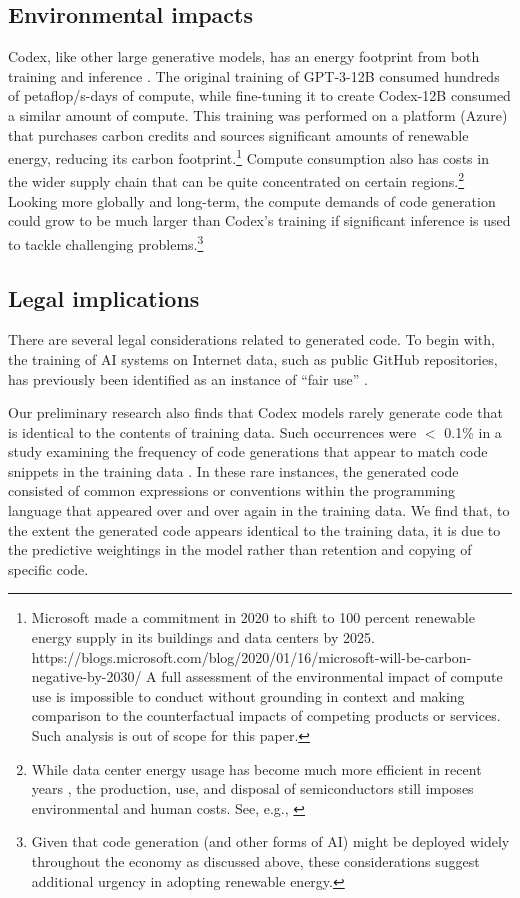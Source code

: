 \subsection{Environmental impacts}
\label{sec:impacts:environment}
Codex, like other large generative models, has an energy footprint from both training and inference \citep{schwartz2019green, bender2021dangers, patterson2021carbon}. The original training of GPT-3-12B consumed hundreds of petaflop/s-days of compute, while fine-tuning it to create Codex-12B consumed a similar amount of compute. This training was performed on a platform (Azure) that purchases carbon credits and sources significant amounts of renewable energy, reducing its carbon footprint.\footnote{Microsoft made a commitment in 2020 to shift to 100 percent renewable energy supply in its buildings and data centers by 2025. https://blogs.microsoft.com/blog/2020/01/16/microsoft-will-be-carbon-negative-by-2030/  A full assessment of the environmental impact of compute use is impossible to conduct without grounding in context and making comparison to the counterfactual impacts of competing products or services. Such analysis is out of scope for this paper.} Compute consumption also has costs in the wider supply chain that can be quite concentrated on certain regions.\footnote{While data center energy usage has become much more efficient in recent years \citep{masanet2020recalibrating}, the production, use, and disposal of semiconductors still imposes environmental and human costs. See, e.g., \citep{crawford2021}} Looking more globally and long-term, the compute demands of code generation could grow to be much larger than Codex’s training if significant inference is used to tackle challenging problems.\footnote{Given that code generation (and other forms of AI) might be deployed widely throughout the economy as discussed above, these considerations suggest additional urgency in adopting renewable energy.}
\subsection{Legal implications}
\label{sec:impacts:legal}

There are several legal considerations related to generated code. To begin with, the training of AI systems on Internet data, such as public GitHub repositories, has previously been identified as an instance of ``fair use'' \citep{o'keefe_lansky_clark_payne_2019}. 

Our preliminary research also finds that Codex models rarely generate code that is identical to the contents of training data. Such occurrences were $<$ 0.1\% in a study examining the frequency of code generations that appear to match code snippets in the training data \citep{ziegler_2021}. In these rare instances, the generated code consisted of common expressions or conventions within the programming language that appeared over and over again in the training data. We find that, to the extent the generated code appears identical to the training data, it is due to the predictive weightings in the model rather than retention and copying of specific code.

